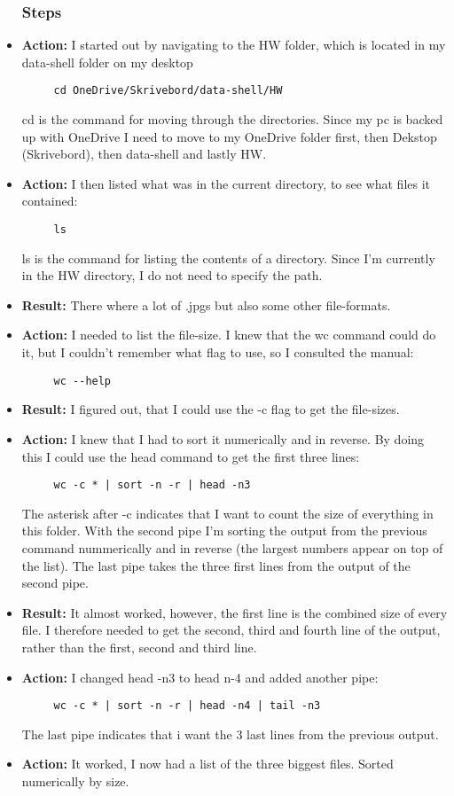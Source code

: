 \documentclass{article}
\begin{document}
\begin{itemize}
    \subsubsection{Steps}
    \item \textbf{Action:} I started out by navigating to the HW folder, which is located in my data-shell folder on my desktop
    \begin{verbatim}
     cd OneDrive/Skrivebord/data-shell/HW
    \end{verbatim}
    cd is the command for moving through the directories. Since my pc is backed up with OneDrive I need to move to my OneDrive folder first, then Dekstop (Skrivebord), then data-shell and lastly HW.
    \item \textbf{Action:} I then listed what was in the current directory, to see what files it contained:
    \begin{verbatim}
     ls
    \end{verbatim}
    ls is the command for listing the contents of a directory. Since I'm currently in the HW directory, I do not need to specify the path.
    \item\textbf{Result:} There where a lot of .jpgs but also some other file-formats.
    \item\textbf{Action:} I needed to list the file-size. I knew that the wc command could do it, but I couldn't remember what flag to use, so I consulted the manual:
    \begin{verbatim}
     wc --help
    \end{verbatim}
    \item\textbf{Result:} I figured out, that I could use the -c flag to get the file-sizes.
    \item \textbf{Action:} I knew that I had to sort it numerically and in reverse. By doing this I could use the head command to get the first three lines:
    \begin{verbatim}
     wc -c * | sort -n -r | head -n3
    \end{verbatim}
    The asterisk after -c indicates that I want to count the size of everything in this folder. With the second pipe I'm sorting the output from the previous command nummerically and in reverse (the largest numbers appear on top of the list). The last pipe takes the three first lines from the output of the second pipe.
    \item \textbf{Result:} It almost worked, however, the first line is the combined size of every file. I therefore needed to get the second, third and fourth line of the output, rather than the first, second and third line.
    \item \textbf{Action:} I changed head -n3 to head n-4 and added another pipe:
    \begin{verbatim}
     wc -c * | sort -n -r | head -n4 | tail -n3 
    \end{verbatim}
    The last pipe indicates that i want the 3 last lines from the previous output.
    \item \textbf{Action:} It worked, I now had a list of the three biggest files. Sorted numerically by size. 
    \end{itemize}
\end{document}
